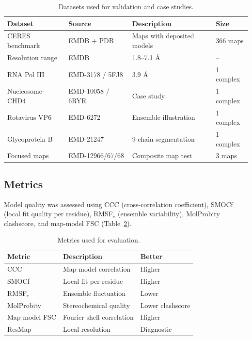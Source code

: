 \documentclass[11pt,a4paper]{article}
\begin{document}
\begin{table}[htbp]
\centering
\caption{Datasets used for validation and case studies.}
\label{tab:datasets}
\small
\begin{tabular}{llll}
\toprule
\textbf{Dataset} & \textbf{Source} & \textbf{Description} & \textbf{Size} \\
\midrule
CERES benchmark & EMDB + PDB & Maps with deposited models & 366 maps \\
Resolution range & EMDB & 1.8--7.1 \AA & -- \\
RNA Pol III & EMD-3178 / 5FJ8 & 3.9 \AA & 1 complex \\
Nucleosome-CHD4 & EMD-10058 / 6RYR & Case study & 1 complex \\
Rotavirus VP6 & EMD-6272 & Ensemble illustration & 1 complex \\
Glycoprotein B & EMD-21247 & 9-chain segmentation & 1 complex \\
Focused maps & EMD-12966/67/68 & Composite map test & 3 maps \\
\bottomrule
\end{tabular}
\end{table}

\subsection{Metrics}
Model quality was assessed using CCC (cross-correlation coefficient), SMOCf (local fit quality per residue), RMSF$_e$ (ensemble variability), MolProbity clashscore, and map-model FSC (Table~\ref{tab:metrics}).

\begin{table}[htbp]
\centering
\caption{Metrics used for evaluation.}
\label{tab:metrics}
\begin{tabular}{lll}
\toprule
\textbf{Metric} & \textbf{Description} & \textbf{Better} \\
\midrule
CCC & Map-model correlation & Higher \\
SMOCf & Local fit per residue & Higher \\
RMSF$_e$ & Ensemble fluctuation & Lower \\
MolProbity & Stereochemical quality & Lower clashscore \\
Map-model FSC & Fourier shell correlation & Higher \\
ResMap & Local resolution & Diagnostic \\
\bottomrule
\end{tabular}
\end{table}
\end{document}
